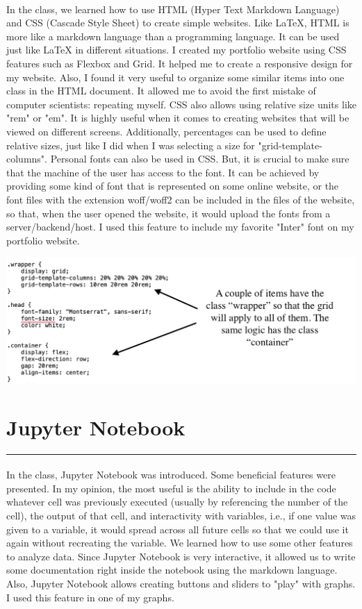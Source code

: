 \documentclass[a4paper,11pt]{article}
\newcommand{\sectitle}[1]{
    \vspace{1.5ex}
    \section{#1}
    \vspace{-3ex}
    \noindent\rule{\textwidth}{0.7pt}
    \vspace{-4ex}
}
\begin{document}
\paragraph{}
In the class, we learned how to use HTML (Hyper Text Markdown Language) and CSS (Cascade Style Sheet) to create simple websites. Like LaTeX, HTML is more like a markdown language than a programming language. It can be used just like LaTeX in different situations. I created my portfolio website using CSS features such as Flexbox and Grid. It helped me to create a responsive design for my website. Also, I found it very useful to organize some similar items into one class in the HTML document. It allowed me to avoid the first mistake of computer scientists: repeating myself. CSS also allows using relative size units like "rem" or "em". It is highly useful when it comes to creating websites that will be viewed on different screens. Additionally, percentages can be used to define relative sizes, just like I did when I was selecting a size for "grid-template-columns". Personal fonts can also be used in CSS. But, it is crucial to make sure that the machine of the user has access to the font. It can be achieved by providing some kind of font that is represented on some online website, or the font files with the extension woff/woff2 can be included in the files of the website, so that, when the user opened the website, it would upload the fonts from a server/backend/host. I used this feature to include my favorite "Inter" font on my portfolio website.
\begin{center}
\includegraphics[scale=0.7]{web.png}
\end{center}

\sectitle{Jupyter Notebook}

\paragraph{}
In the class, Jupyter Notebook was introduced. Some beneficial features were presented. In my opinion, the most useful is the ability to include in the code whatever cell was previously executed (usually by referencing the number of the cell), the output of that cell, and interactivity with variables, i.e., if one value was given to a variable, it would spread across all future cells so that we could use it again without recreating the variable. We learned how to use some other features to analyze data. Since Jupyter Notebook is very interactive, it allowed us to write some documentation right inside the notebook using the markdown language. Also, Jupyter Notebook allows creating buttons and sliders to "play" with graphs. I used this feature in one of my graphs. 
\end{document}
